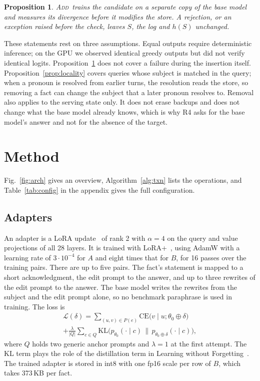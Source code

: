 \documentclass[journal,10pt]{IEEEtran}
\newtheorem{proposition}{Proposition}
\newcommand{\commit}{\textsc{Add}}
\begin{document}
\begin{proposition}\label{prop:atomic}
\commit\ trains the candidate on a separate copy of the base model and measures its divergence before it
modifies the store. A rejection, or an exception raised before the check, leaves $S$, the log and $h(S)$
unchanged.
\end{proposition}

These statements rest on three assumptions. Equal outputs require deterministic inference; on the GPU we
observed identical greedy outputs but did not verify identical logits. Proposition~\ref{prop:atomic} does
not cover a failure during the insertion itself. Proposition~\ref{prop:locality} covers queries whose
subject is matched in the query; when a pronoun is resolved from earlier turns, the resolution reads the
store, so removing a fact can change the subject that a later pronoun resolves to. Removal also applies to
the serving state only. It does not erase backups and does not change what the base model already knows,
which is why R4 asks for the base model's answer and not for the absence of the target.

\section{Method}
\label{sec:method}



Fig.~\ref{fig:arch} gives an overview, Algorithm~\ref{alg:txn} lists the operations, and
Table~\ref{tab:config} in the appendix gives the full configuration.

\subsection{Adapters}
An adapter is a LoRA update~\cite{hu2022lora} of rank 2 with $\alpha=4$ on the query and value projections
of all 28 layers. It is trained with LoRA+~\cite{hayou2024loraplus}, using AdamW with a learning rate of
$3\cdot10^{-4}$ for $A$ and eight times that for $B$, for 16 passes over the training pairs. There are up to
five pairs. The fact's statement is mapped to a short acknowledgment, the edit prompt to the answer, and up
to three rewrites of the edit prompt to the answer. The base model writes the rewrites from the subject and
the edit prompt alone, so no benchmark paraphrase is used in training. The loss is
\begin{multline}
\mathcal{L}(\delta)=\sum_{(u,v)\in P(e)}\mathrm{CE}\big(v\mid u;\theta_0\oplus\delta\big)\\
+\frac{\lambda}{|Q|}\sum_{c\in Q}\mathrm{KL}\big(p_{\theta_0}(\cdot\mid c)\,\big\|\,
p_{\theta_0\oplus\delta}(\cdot\mid c)\big),
\label{eq:loss}
\end{multline}
where $Q$ holds two generic anchor prompts and $\lambda=1$ at the first attempt. The KL term plays the role
of the distillation term in Learning without Forgetting~\cite{li2018lwf}. The trained adapter is stored in
int8 with one fp16 scale per row of $B$, which takes 373\,KB per fact.
\end{document}
